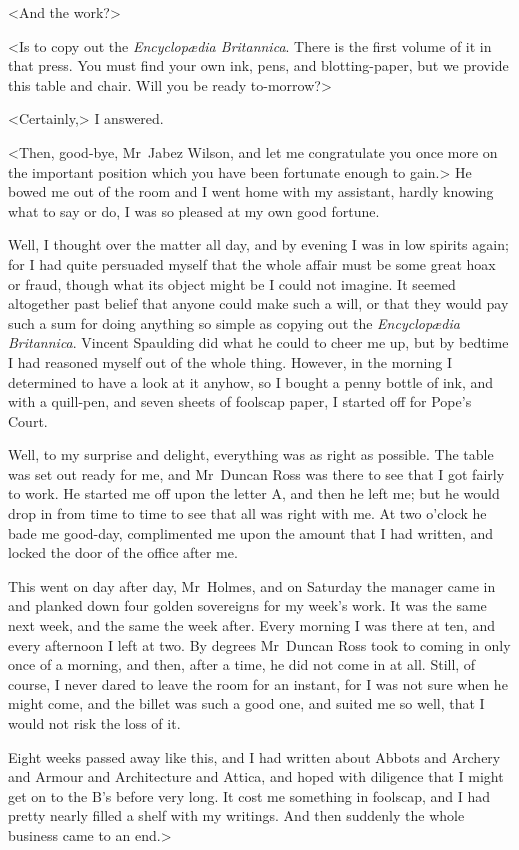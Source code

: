 <And the work?>

<Is to copy out the \textit{Encyclopædia Britannica}. There is the first volume of it in that press. You must find your own ink, pens, and blotting-paper, but we provide this table and chair. Will you be ready to-morrow?>

<Certainly,> I answered.

<Then, good-bye, Mr~Jabez Wilson, and let me congratulate you once more on the important position which you have been fortunate enough to gain.> He bowed me out of the room and I went home with my assistant, hardly knowing what to say or do, I was so pleased at my own good fortune.

Well, I thought over the matter all day, and by evening I was in low spirits again; for I had quite persuaded myself that the whole affair must be some great hoax or fraud, though what its object might be I could not imagine. It seemed altogether past belief that anyone could make such a will, or that they would pay such a sum for doing anything so simple as copying out the \textit{Encyclopædia Britannica}. Vincent Spaulding did what he could to cheer me up, but by bedtime I had reasoned myself out of the whole thing. However, in the morning I determined to have a look at it anyhow, so I bought a penny bottle of ink, and with a quill-pen, and seven sheets of foolscap paper, I started off for Pope's Court.

Well, to my surprise and delight, everything was as right as possible. The table was set out ready for me, and Mr~Duncan Ross was there to see that I got fairly to work. He started me off upon the letter A, and then he left me; but he would drop in from time to time to see that all was right with me. At two o'clock he bade me good-day, complimented me upon the amount that I had written, and locked the door of the office after me.

This went on day after day, Mr~Holmes, and on Saturday the manager came in and planked down four golden sovereigns for my week's work. It was the same next week, and the same the week after. Every morning I was there at ten, and every afternoon I left at two. By degrees Mr~Duncan Ross took to coming in only once of a morning, and then, after a time, he did not come in at all. Still, of course, I never dared to leave the room for an instant, for I was not sure when he might come, and the billet was such a good one, and suited me so well, that I would not risk the loss of it.

Eight weeks passed away like this, and I had written about Abbots and Archery and Armour and Architecture and Attica, and hoped with diligence that I might get on to the B's before very long. It cost me something in foolscap, and I had pretty nearly filled a shelf with my writings. And then suddenly the whole business came to an end.>

